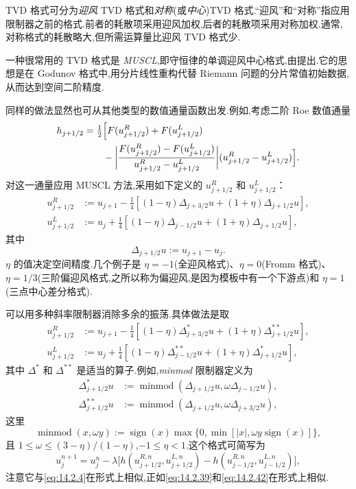 TVD 格式可分为\emph{迎风} TVD 格式和\emph{对称}(或\emph{中心})TVD 格式.“迎风”和“对称”指应用限制器之前的格式.前者的耗散项采用迎风加权,后者的耗散项采用对称加权.通常,对称格式的耗散略大,但所需运算量比迎风 TVD 格式少.

\begin{example}[MUSCL 格式]\label{ex:14.2.muscl}
一种很常用的 TVD 格式是 \emph{MUSCL},即守恒律的单调迎风中心格式,由提出.它的思想是在 Godunov 格式中,用分片线性重构代替 Riemann 问题的分片常值初始数据,从而达到空间二阶精度.

同样的做法显然也可从其他类型的数值通量函数出发.例如,考虑二阶 Roe 数值通量
\begin{equation}\label{eq:14.2.42}
  \begin{aligned}
    h_{j+1/2}
      &=\tfrac12\Bigl[F(u_{j+1/2}^R)+F(u_{j+1/2}^L)\\
      &\qquad-\biggl|\frac{F(u_{j+1/2}^R)-F(u_{j+1/2}^L)}
                          {u_{j+1/2}^R-u_{j+1/2}^L}\biggr|
                    (u_{j+1/2}^R-u_{j+1/2}^L)\Bigr].
  \end{aligned}
\end{equation}
对这一通量应用 MUSCL 方法,采用如下定义的 \(u_{j+1/2}^R\) 和 \(u_{j+1/2}^L\)：
\[
  \begin{aligned}
    u_{j+1/2}^R&:=u_{j+1}
      -\tfrac14[(1-\eta)\Delta_{j+3/2}u+(1+\eta)\Delta_{j+1/2}u],\\
    u_{j+1/2}^L&:=u_j
      +\tfrac14[(1-\eta)\Delta_{j-1/2}u+(1+\eta)\Delta_{j+1/2}u],
  \end{aligned}
\]
其中
\[
  \Delta_{j+1/2}u:=u_{j+1}-u_j.
\]
\(\eta\) 的值决定空间精度.几个例子是 \(\eta=-1\)(全迎风格式)、\(\eta=0\)(Fromm 格式)、\(\eta=1/3\)(三阶偏迎风格式,之所以称为偏迎风,是因为模板中有一个下游点)和 \(\eta=1\)(三点中心差分格式).

可以用多种斜率限制器消除多余的振荡.具体做法是取
\[
  \begin{aligned}
    u_{j+1/2}^R&:=u_{j+1}
      -\tfrac14[(1-\eta)\Delta^*_{j+3/2}u+(1+\eta)\Delta^{**}_{j+1/2}u],\\
    u_{j+1/2}^L&:=u_j
      +\tfrac14[(1-\eta)\Delta^{**}_{j-1/2}u+(1+\eta)\Delta^*_{j+1/2}u],
  \end{aligned}
\]
其中 \(\Delta^*\) 和 \(\Delta^{**}\) 是适当的算子.例如,\emph{minmod} 限制器定义为
\[
  \begin{aligned}
    \Delta^*_{j+1/2}u&:=\operatorname{minmod}(\Delta_{j+1/2}u,\omega\Delta_{j-1/2}u),\\
    \Delta^{**}_{j+1/2}u&:=\operatorname{minmod}(\Delta_{j+1/2}u,\omega\Delta_{j+3/2}u),
  \end{aligned}
\]
这里
\[
  \operatorname{minmod}(x,\omega y)
    :=\operatorname{sign}(x)\max\{0,\min[|x|,\omega y\operatorname{sign}(x)]\},
\]
且 \(1\le\omega\le(3-\eta)/(1-\eta)\),\(-1\le\eta<1\).这个格式可简写为
\begin{equation}\label{eq:14.2.43}
  u_j^{n+1}=u_j^n-\lambda\bigl[
     h(u_{j+1/2}^{R,n},u_{j+1/2}^{L,n})-h(u_{j-1/2}^{R,n},u_{j-1/2}^{L,n})\bigr],
\end{equation}
注意它与\eqref{eq:14.2.4}在形式上相似,正如\eqref{eq:14.2.39}和\eqref{eq:14.2.42}在形式上相似.
\end{example}

